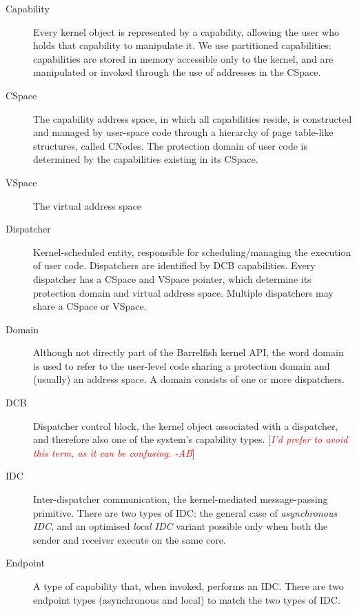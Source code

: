 \documentclass{scrreprt}
\newcommand{\note}[1]{ [\textcolor{red}{\emph{#1}}]}
\begin{document}
  \begin{description}
  \item[Capability] Every kernel object is represented by a capability,
    allowing the user who holds that capability to manipulate it. We use
    partitioned capabilities: capabilities are stored in memory accessible only
    to the kernel, and are manipulated or invoked through the use of addresses
    in the CSpace.

  \item[CSpace] The capability address space, in which all capabilities reside,
    is constructed and managed by user-space code through a hierarchy of page
    table-like structures, called CNodes. The protection domain of user code
    is determined by the capabilities existing in its CSpace.

  \item[VSpace] The virtual address space

  \item[Dispatcher] Kernel-scheduled entity, responsible for
    scheduling/managing the execution of user code. Dispatchers are identified
    by DCB capabilities. Every dispatcher has a CSpace and VSpace pointer,
    which determine its protection domain and virtual address space. Multiple
    dispatchers may share a CSpace or VSpace.

  \item[Domain] Although not directly part of the Barrelfish kernel API, the
    word domain is used to refer to the user-level code sharing a protection
    domain and (usually) an address space. A domain consists of one or more
    dispatchers.

  \item[DCB] Dispatcher control block, the kernel object associated with
    a dispatcher, and therefore also one of the system's capability types.
    \note{I'd prefer to avoid this term, as it can be confusing. -AB}

  \item[IDC] Inter-dispatcher communication, the kernel-mediated message-passing
    primitive. There are two types of IDC: the general case of
    \emph{asynchronous IDC}, and an optimised \emph{local IDC} variant possible
    only when both the sender and receiver execute on the same core.

  \item[Endpoint] A type of capability that, when invoked, performs an IDC.
    There are two endpoint types (asynchronous and local) to match the two
    types of IDC.


\end{description}
\end{document}
